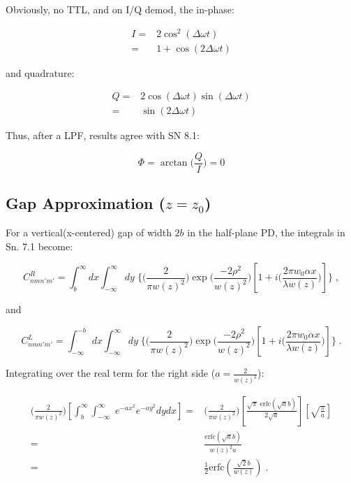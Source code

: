 \documentclass[aps,twoside,secnumarabic,balancelastpage,amsmath,amssymb,nofootinbib,hyperref=pdftex]{revtex4}
\newcommand{\bigfrac}[2]{\Big( \frac{#1}{#2}\Big)}
\begin{document}
Obviously, no TTL, and on I/Q demod, the in-phase:

\begin{align*}
I =& 2 \cos^2 (\Delta \omega t)
 \\=& 1 + \cos(2 \Delta \omega t)
\end{align*}

and quadrature:

\begin{align*}
Q =& 2 \cos(\Delta \omega t) \sin (\Delta \omega t)
 \\=& \sin(2 \Delta \omega t)
\end{align*}

Thus, after a LPF, results agree with SN 8.1:

\begin{equation}
\Phi = \arctan \bigfrac{Q}{I} = 0
\end{equation}

\subsection{Gap Approximation ($z=z_0$) }

For a vertical(x-centered) gap of width $2b$ in the half-plane PD, the integrals in Sn. 7.1 become:

\begin{equation}
C_{nmn'm'}^{R} = \int_{b}^{\infty} dx\int_{-\infty}^{\infty}  dy \;
\lbrace
	\bigfrac{2}{\pi w(z)^2}
	\exp \bigfrac{-2 \rho^2}{w(z)^{2}}	
	\left[
		1 
		+ 
		i  \bigfrac{ 2 \pi w_{0} \alpha x}{\lambda w(z)}		
	\right]
\rbrace
\;,
\end{equation}	

and

\begin{equation}
C_{nmn'm'}^{L} = \int_{-\infty}^{-b} dx\int_{-\infty}^{\infty}  dy \;
\lbrace
	\bigfrac{2}{\pi w(z)^2}
	\exp \bigfrac{-2 \rho^2}{w(z)^{2}}	
	\left[
		1 
		+ 
		i  \bigfrac{ 2 \pi w_{0} \alpha x}{\lambda w(z)}		
	\right]
\rbrace
\;.
\end{equation}	

Integrating over the real term for the right side ($a = \frac{2}{w(z)^2}$):

\begin{align*}
\bigfrac{2}{\pi w(z)^2}
\left[
\int_{b}^{\infty} \int_{-\infty}^{\infty}  \; e^{-a x^2} e^{-a y^2} dydx \right]
=&
 \bigfrac{2}{\pi w(z)^2}
 \left[ \frac{ \sqrt{\pi} \; \text{erfc}(\sqrt{a}b)}{2 \sqrt{a}} \right]
 \left[ \sqrt{\frac{\pi}{a} } \right]
 \\=& 
 \frac{\text{erfc}(\sqrt{a} b)} {w(z)^2 a}
 \\=&
 \frac{1} {2} \text{erfc}(\frac{\sqrt{2} b}{w(z)})
\;.
\end{align*}
\end{document}
